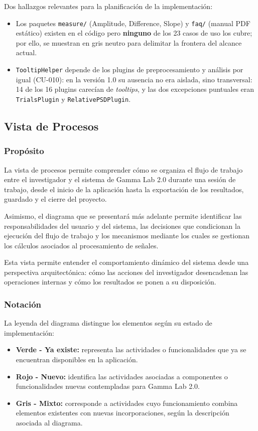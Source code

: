 \documentclass[11pt,a4paper]{article}
\DeclareRobustCommand{\_}{\textunderscore\allowbreak}
\begin{document}
Dos hallazgos relevantes para la planificaci\'on de la implementaci\'on:
\begin{itemize}[nosep]
    \item Los paquetes \texttt{measure/} (Amplitude, Difference, Slope) y \texttt{faq/} (manual PDF est\'atico) existen en el c\'odigo pero \textbf{ninguno} de los 23 casos de uso los cubre; por ello, se muestran en gris neutro para delimitar la frontera del alcance actual.
    \item \texttt{TooltipHelper} depende de los plugins de preprocesamiento y an\'alisis por igual (CU-010): en la versión 1.0 su ausencia no era aislada, sino transversal: 14 de los 16 plugins carecían de \textit{tooltips}, y las dos excepciones puntuales eran \texttt{TrialsPlugin} y \texttt{RelativePSDPlugin}.
\end{itemize}

\subsection{Vista de Procesos}

\subsubsection{Propósito}
La vista de procesos permite comprender cómo se organiza el flujo de trabajo entre el investigador y el sistema de Gamma Lab 2.0 durante una sesión de trabajo, desde el inicio de la aplicación hasta la exportación de los resultados, guardado y el cierre del proyecto.

Asimismo, el diagrama que se presentará más adelante permite identificar las responsabilidades del usuario y del sistema, las decisiones que condicionan la ejecución del flujo de trabajo y los mecanismos mediante los cuales se gestionan los cálculos asociados al procesamiento de señales.

Esta vista permite entender el comportamiento dinámico del sistema desde una perspectiva arquitectónica: cómo las acciones del investigador desencadenan las operaciones internas y cómo los resultados se ponen a su disposición.

\subsubsection{Notación}
La leyenda del diagrama distingue los elementos según su estado de implementación:

\begin{itemize}
    \item \textbf{Verde - Ya existe:} representa las actividades o funcionalidades que ya se encuentran disponibles en la aplicación.
    
    \item \textbf{Rojo - Nuevo:} identifica las actividades asociadas a componentes o funcionalidades nuevas contempladas para Gamma Lab 2.0.
    
    \item \textbf{Gris - Mixto:} corresponde a actividades cuyo funcionamiento combina elementos existentes con nuevas incorporaciones, según la descripción asociada al diagrama.

\end{itemize}
\end{document}

